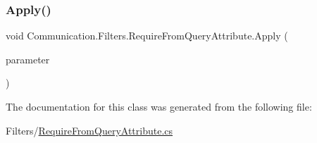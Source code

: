 \subsubsection{\texorpdfstring{Apply()}{Apply()}}
{\footnotesize\ttfamily void Communication.\+Filters.\+Require\+From\+Query\+Attribute.\+Apply (\begin{DoxyParamCaption}\item[{Parameter\+Model}]{parameter }\end{DoxyParamCaption})}



The documentation for this class was generated from the following file\+:\begin{DoxyCompactItemize}
\item 
Filters/\mbox{\hyperlink{_require_from_query_attribute_8cs}{Require\+From\+Query\+Attribute.\+cs}}\end{DoxyCompactItemize}
